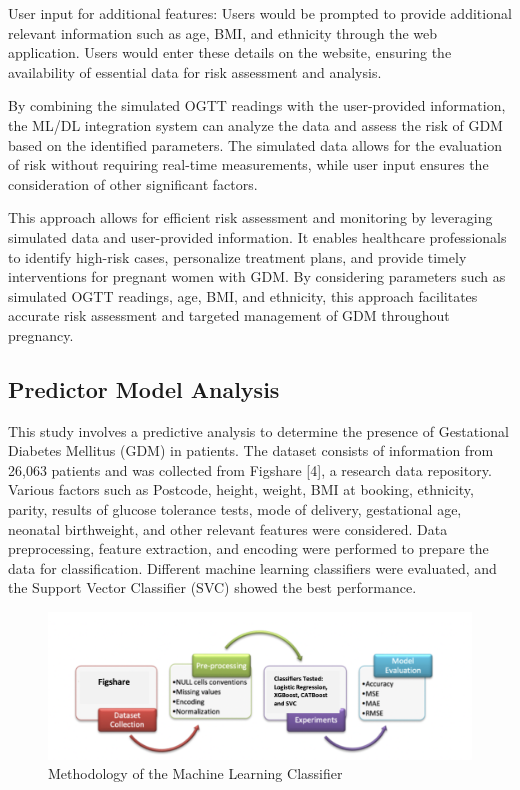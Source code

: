 \documentclass[conference,compsoc]{IEEEtran}
\begin{document}
User input for additional features: Users would be prompted to provide additional relevant information such as age, BMI, and ethnicity through the web application. Users would enter these details on the website, ensuring the availability of essential data for risk assessment and analysis.

By combining the simulated OGTT readings with the user-provided information, the ML/DL integration system can analyze the data and assess the risk of GDM based on the identified parameters. The simulated data allows for the evaluation of risk without requiring real-time measurements, while user input ensures the consideration of other significant factors.

This approach allows for efficient risk assessment and monitoring by leveraging simulated data and user-provided information. It enables healthcare professionals to identify high-risk cases, personalize treatment plans, and provide timely interventions for pregnant women with GDM. By considering parameters such as simulated OGTT readings, age, BMI, and ethnicity, this approach facilitates accurate risk assessment and targeted management of GDM throughout pregnancy.


\subsection{Predictor Model Analysis}

This study involves a predictive analysis to determine the presence of Gestational Diabetes Mellitus (GDM) in patients. The dataset consists of information from 26,063 patients and was collected from Figshare [4], a research data repository. Various factors such as Postcode, height, weight, BMI at booking, ethnicity, parity, results of glucose tolerance tests, mode of delivery, gestational age, neonatal birthweight, and other relevant features were considered. Data preprocessing, feature extraction, and encoding were performed to prepare the data for classification. Different machine learning classifiers were evaluated, and the Support Vector Classifier (SVC) showed the best performance.

\begin{figure}[!htbp]
  \centering
  \includegraphics[width=0.8\columnwidth]{IEEEtran/Classifier_workflow.png} %
  \caption{Methodology of the Machine Learning Classifier}
  \label{fig:glucometer_diag}
\end{figure}
\end{document}
